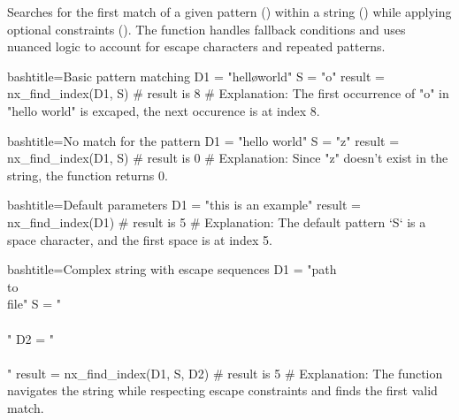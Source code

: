 \begin{NexMainBox}
	\begin{NexMainBox}
		Searches for the first match of a given pattern () within a string () while applying optional constraints (). The function handles fallback conditions and uses nuanced logic to account for escape characters and repeated patterns.
	\end{NexMainBox}
	\begin{NexMainBox}
		\begin{NexListDark}
		\end{NexListDark}
	\end{NexMainBox}
\end{NexMainBox}

\begin{NexCodeBox}{bash}{title={Basic pattern matching}}
	D1 = "hell\o world"
	S = "o"
	result = nx_find_index(D1, S)
	# result is 8
	# Explanation: The first occurrence of "o" in "hello world" is excaped, the next occurence is at index 8.
\end{NexCodeBox}

\begin{NexCodeBox}{bash}{title={No match for the pattern}}
	D1 = "hello world"
	S = "z"
	result = nx_find_index(D1, S)
	# result is 0
	# Explanation: Since "z" doesn't exist in the string, the function returns 0.
\end{NexCodeBox}

\begin{NexCodeBox}{bash}{title={Default parameters}}
	D1 = "this is an example"
	result = nx_find_index(D1)
	# result is 5
	# Explanation: The default pattern `S` is a space character, and the first space is at index 5.
\end{NexCodeBox}

\begin{NexCodeBox}{bash}{title={Complex string with escape sequences}}
	D1 = "path\\to\\file"
	S = "\\\\"
	D2 = "\\\\"
	result = nx_find_index(D1, S, D2)
	# result is 5
	# Explanation: The function navigates the string while respecting escape constraints and finds the first valid match.
\end{NexCodeBox}


